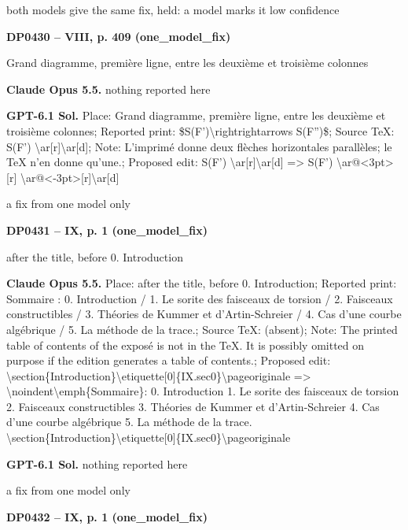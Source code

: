 both models give the same fix, held: a model marks it low confidence\par
\par\noindent\hypertarget{DP0430}{}\textbf{DP0430 -- VIII, p. 409 (one\_model\_fix)}\par
Grand diagramme, première ligne, entre les deuxième et troisième colonnes\par
\textbf{Claude Opus 5.5.} nothing reported here\par
\textbf{GPT-6.1 Sol.} Place: Grand diagramme, première ligne, entre les deuxième et troisième colonnes; Reported print: \$S(F')\textbackslash{}rightrightarrows S(F'')\$; Source TeX: S(F') \textbackslash{}ar[r]\textbackslash{}ar[d]; Note: L'imprimé donne deux flèches horizontales parallèles; le TeX n'en donne qu'une.; Proposed edit: S(F') \textbackslash{}ar[r]\textbackslash{}ar[d] =\allowbreak > S(F') \textbackslash{}ar@<3pt>[r] \textbackslash{}ar@<-3pt>[r]\textbackslash{}ar[d]\par
a fix from one model only\par
\par\noindent\hypertarget{DP0431}{}\textbf{DP0431 -- IX, p. 1 (one\_model\_fix)}\par
after the title, before 0. Introduction\par
\textbf{Claude Opus 5.5.} Place: after the title, before 0. Introduction; Reported print: Sommaire : 0. Introduction / 1. Le sorite des faisceaux de torsion / 2. Faisceaux constructibles / 3. Théories de Kummer et d'Artin-Schreier / 4. Cas d'une courbe algébrique / 5. La méthode de la trace.; Source TeX: (absent); Note: The printed table of contents of the exposé is not in the TeX. It is possibly omitted on purpose if the edition generates a table of contents.; Proposed edit: \textbackslash{}section\{Introduction\}\textbackslash{}etiquette[0]\{IX.sec0\}\textbackslash{}pageoriginale =\allowbreak > \textbackslash{}noindent\textbackslash{}emph\{Sommaire\}: 0. Introduction 1. Le sorite des faisceaux de torsion 2. Faisceaux constructibles 3. Théories de Kummer et d'Artin-Schreier 4. Cas d'une courbe algébrique 5. La méthode de la trace.  \textbackslash{}section\{Introduction\}\textbackslash{}etiquette[0]\{IX.sec0\}\textbackslash{}pageoriginale\par
\textbf{GPT-6.1 Sol.} nothing reported here\par
a fix from one model only\par
\par\noindent\hypertarget{DP0432}{}\textbf{DP0432 -- IX, p. 1 (one\_model\_fix)}\par
